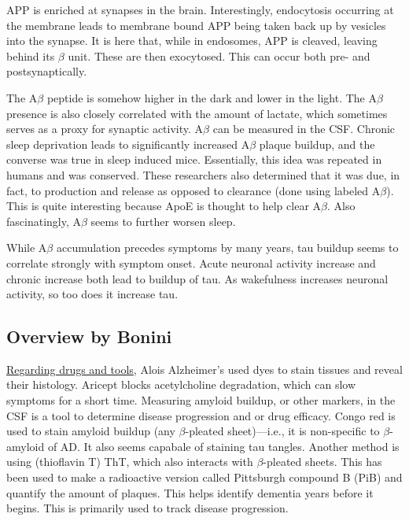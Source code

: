 \documentclass[12pt]{report}
\begin{document}
APP is enriched at synapses in the brain. Interestingly, endocytosis occurring at the membrane leads to membrane bound APP being taken back up by vesicles into the synapse. It is here that, while in endosomes, APP is cleaved, leaving behind its $\beta$ unit. These are then exocytosed. This can occur both pre- and postsynaptically.\newline

The A$\beta$ peptide is somehow higher in the dark and lower in the light. The A$\beta$ presence is also closely correlated with the amount of lactate, which sometimes serves as a proxy for synaptic activity. A$\beta$ can be measured in the CSF. Chronic sleep deprivation leads to significantly increased A$\beta$ plaque buildup, and the converse was true in sleep induced mice. Essentially, this idea was repeated in humans and was conserved. These researchers also determined that it was due, in fact, to production and release as opposed to clearance (done using labeled A$\beta$). This is quite interesting because ApoE is thought to help clear A$\beta$. Also fascinatingly, A$\beta$ seems to further worsen sleep.\newline

While A$\beta$ accumulation precedes symptoms by many years, tau buildup seems to correlate strongly with symptom onset. Acute neuronal activity increase and chronic increase both lead to buildup of tau. As wakefulness increases neuronal activity, so too does it increase tau.\newline

\subsection*{Overview by Bonini}

\underline{Regarding drugs and tools}, Alois Alzheimer's used dyes to stain tissues and reveal their histology. Aricept blocks acetylcholine degradation, which can slow symptoms for a short time. Measuring amyloid buildup, or other markers, in the CSF is a tool to determine disease progression and or drug efficacy. Congo red is used to stain amyloid buildup (any $\beta$-pleated sheet)---i.e., it is non-specific to $\beta$-amyloid of AD. It also seems capabale of staining tau tangles. Another method is using (thioflavin T) ThT, which also interacts with $\beta$-pleated sheets. This has been used to make a radioactive version called Pittsburgh compound B (PiB) and quantify the amount of plaques. This helps identify dementia years before it begins. This is primarily used to track disease progression.\newline
\end{document}
